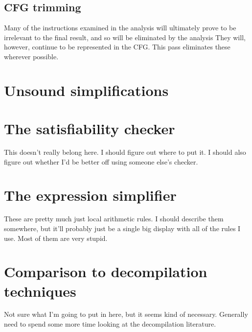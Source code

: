\documentclass[12pt,a4paper]{book}
\begin{document}




\subsection{CFG trimming}

Many of the instructions examined in the analysis will ultimately prove to be irrelevant to the final result, and so will be eliminated by the analysis
They will, however, continue to be represented in the \StateMachine CFG.
This pass eliminates these wherever possible.


\section{Unsound simplifications}
\section{The satisfiability checker}
This doesn't really belong here.  I should figure out where to put it.  I should also figure out whether I'd be better off using someone else's checker.

\section{The expression simplifier}
These are pretty much just local arithmetic rules.
I should describe them somewhere, but it'll probably just be a single big display with all of the rules I use.
Most of them are very stupid.

\section{Comparison to decompilation techniques}
Not sure what I'm going to put in here, but it seems kind of necessary.
Generally need to spend some more time looking at the decompilation literature.
\end{document}
